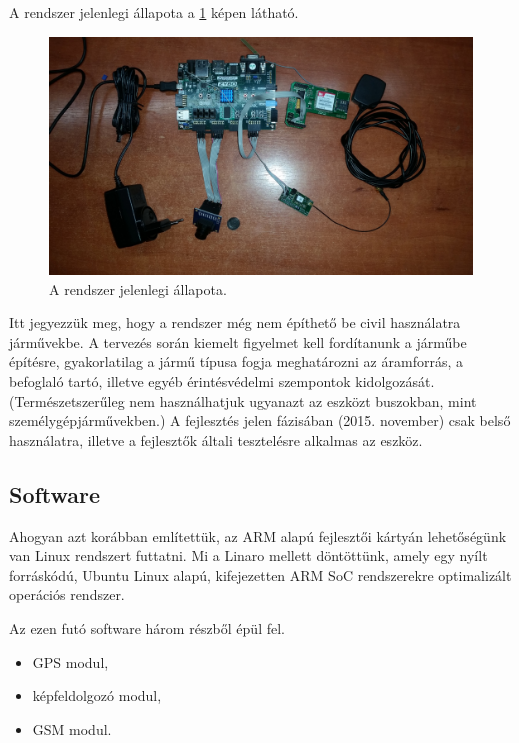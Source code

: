 \documentclass[a4paper,12pt]{report}
\begin{document}
A rendszer jelenlegi állapota a \ref{currentsys} képen látható.

\begin{figure}[h]
\centerline{
\includegraphics[width=6in]{img/currentsys}}
\caption{A rendszer jelenlegi állapota.}
\label{currentsys}
\end{figure}

Itt jegyezzük meg, hogy a rendszer még nem építhető be civil használatra járművekbe. A tervezés során kiemelt figyelmet kell fordítanunk a járműbe építésre, gyakorlatilag a jármű típusa fogja meghatározni az áramforrás, a befoglaló tartó, illetve egyéb érintésvédelmi szempontok kidolgozását. (Természetszerűleg nem használhatjuk ugyanazt az eszközt buszokban, mint személygépjárművekben.) A fejlesztés jelen fázisában (2015. november) csak belső használatra, illetve a fejlesztők általi tesztelésre alkalmas az eszköz.

\subsection{Software}
\label{rttasw}

Ahogyan azt korábban említettük, az ARM alapú fejlesztői kártyán lehetőségünk van Linux rendszert futtatni. Mi a Linaro mellett döntöttünk, amely egy nyílt forráskódú, Ubuntu Linux alapú, kifejezetten ARM SoC rendszerekre optimalizált operációs rendszer. 

Az ezen futó software három részből épül fel.

\begin{itemize}
\item GPS modul,
\item képfeldolgozó modul,
\item GSM modul.
\end{itemize}
\end{document}

